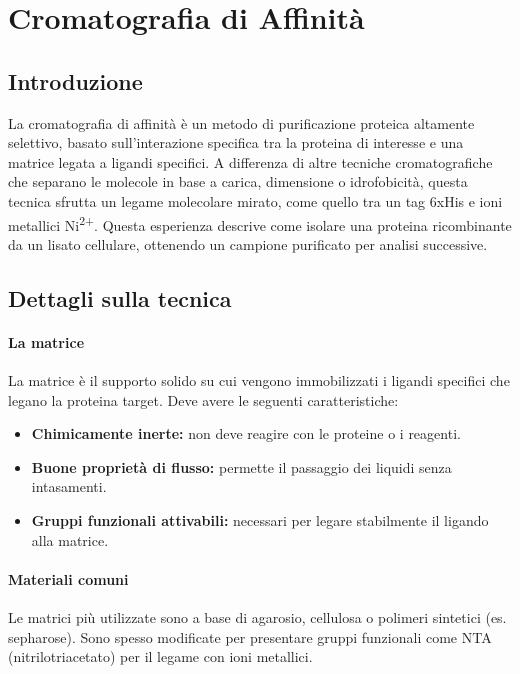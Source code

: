 \section {Cromatografia di Affinità}

\subsection{Introduzione}
La cromatografia di affinità è un metodo di purificazione proteica altamente selettivo, basato sull’interazione specifica tra la proteina di interesse e una matrice legata a ligandi specifici.  
A differenza di altre tecniche cromatografiche che separano le molecole in base a carica, dimensione o idrofobicità, questa tecnica sfrutta un legame molecolare mirato, come quello tra un tag 6xHis e ioni metallici Ni\textsuperscript{2+}.  
Questa esperienza descrive come isolare una proteina ricombinante da un lisato cellulare, ottenendo un campione purificato per analisi successive.

\subsection{Dettagli sulla tecnica}

\paragraph{La matrice}
La matrice è il supporto solido su cui vengono immobilizzati i ligandi specifici che legano la proteina target.  
Deve avere le seguenti caratteristiche:

\begin{itemize}
  \item \textbf{Chimicamente inerte:} non deve reagire con le proteine o i reagenti.
  \item \textbf{Buone proprietà di flusso:} permette il passaggio dei liquidi senza intasamenti.
  \item \textbf{Gruppi funzionali attivabili:} necessari per legare stabilmente il ligando alla matrice.
\end{itemize}

\paragraph{Materiali comuni}
Le matrici più utilizzate sono a base di agarosio, cellulosa o polimeri sintetici (es. sepharose).  
Sono spesso modificate per presentare gruppi funzionali come NTA (nitrilotriacetato) per il legame con ioni metallici.

